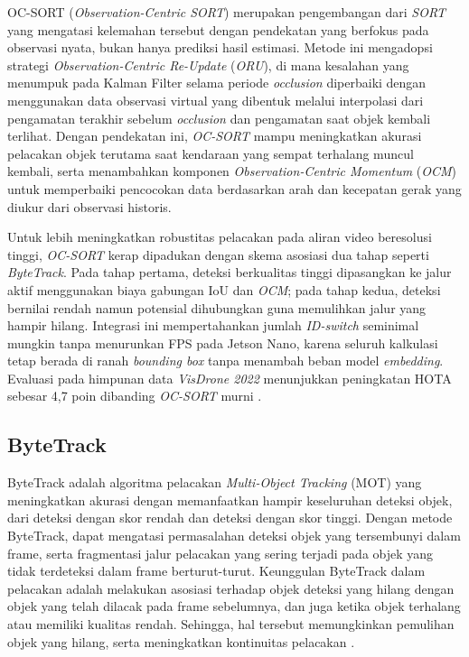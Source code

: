 OC-SORT (\emph{Observation-Centric SORT}) merupakan pengembangan dari \emph{SORT} yang mengatasi kelemahan tersebut dengan pendekatan yang berfokus pada observasi nyata, bukan hanya prediksi hasil estimasi. Metode ini mengadopsi strategi \emph{Observation-Centric Re-Update} (\emph{ORU}), di mana kesalahan yang menumpuk pada Kalman Filter selama periode \emph{occlusion} diperbaiki dengan menggunakan data observasi virtual yang dibentuk melalui interpolasi dari pengamatan terakhir sebelum \emph{occlusion} dan pengamatan saat objek kembali terlihat. Dengan pendekatan ini, \emph{OC-SORT} mampu meningkatkan akurasi pelacakan objek terutama saat kendaraan yang sempat terhalang muncul kembali, serta menambahkan komponen \emph{Observation-Centric Momentum} (\emph{OCM}) untuk memperbaiki pencocokan data berdasarkan arah dan kecepatan gerak yang diukur dari observasi historis\cite{Cao2023}.

Untuk lebih meningkatkan robust­itas pelacakan pada aliran video beresolusi tinggi, \emph{OC-SORT} kerap dipadukan dengan skema asosiasi dua tahap seperti \emph{ByteTrack}. Pada tahap pertama, deteksi berkualitas tinggi dipasangkan ke jalur aktif menggunakan biaya gabungan IoU dan \emph{OCM}; pada tahap kedua, deteksi bernilai rendah namun potensial dihubungkan guna memulihkan jalur yang hampir hilang. Integrasi ini mempertahankan jumlah \emph{ID-switch} seminimal mungkin tanpa menurunkan FPS pada Jetson Nano, karena seluruh kalkulasi tetap berada di ranah \emph{bounding box} tanpa menambah beban model \emph{embedding}. Evaluasi pada himpunan data \emph{VisDrone 2022} menunjukkan peningkatan HOTA sebesar 4{,}7 poin dibanding \emph{OC-SORT} murni \cite{Zhang2022ByteTrack}.

\subsection{ByteTrack}
ByteTrack adalah algoritma pelacakan \emph{Multi-Object Tracking} (MOT) yang meningkatkan akurasi dengan memanfaatkan hampir keseluruhan deteksi objek, dari deteksi dengan skor rendah dan deteksi dengan skor tinggi. Dengan metode ByteTrack, dapat mengatasi permasalahan deteksi objek yang tersembunyi dalam frame, serta fragmentasi jalur pelacakan yang sering terjadi pada objek yang tidak terdeteksi dalam frame berturut-turut. Keunggulan ByteTrack dalam pelacakan adalah melakukan asosiasi terhadap objek deteksi yang hilang dengan objek yang telah dilacak pada frame sebelumnya, dan juga ketika objek terhalang atau memiliki kualitas rendah. Sehingga, hal tersebut memungkinkan pemulihan objek yang hilang, serta meningkatkan kontinuitas pelacakan \cite{Zhang2022ByteTrack}.

